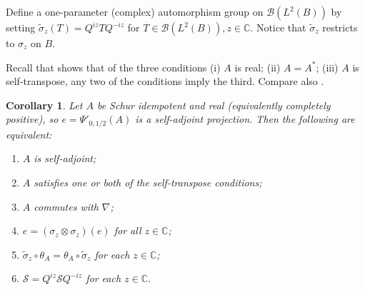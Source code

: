 \documentclass[a4paper,11pt]{article}
\theoremstyle{plain}
\newtheorem{corollary}[proposition]{Corollary}
\theoremstyle{remark}
\newcommand{\mc}[1]{\mathcal{#1}}
\begin{document}
Define a one-parameter (complex) automorphism group on $\mc B(L^2(B))$ by setting $\tilde\sigma_z(T) = Q^{iz} T Q^{-iz}$ for $T\in\mc B(L^2(B)), z\in\mathbb C$.  Notice that $\tilde\sigma_z$ restricts to $\sigma_z$ on $B$.

Recall that \cite{matsuda_class_m2} shows that of the three conditions (i) $A$ is real; (ii) $A=A^*$; (iii) $A$ is self-transpose, any two of the conditions imply the third.  Compare also \cite[Theorem~5.17]{daws_quantum_graphs}.

\begin{corollary}
Let $A$ be Schur idempotent and real (equivalently completely positive), so $e = \Psi'_{0,1/2}(A)$ is a self-adjoint projection.  Then the following are equivalent:
\begin{enumerate}
  \item $A$ is self-adjoint;
  \item $A$ satisfies one or both of the self-transpose conditions;
  \item $A$ commutes with $\nabla$;
  \item $e = (\sigma_z\otimes\sigma_z)(e)$ for all $z\in\mathbb C$;
  \item $\tilde\sigma_z \circ \theta_A = \theta_A \circ \tilde\sigma_z$ for each $z\in\mathbb C$;
  \item $\mc S = Q^{iz} \mc S Q^{-iz}$ for each $z\in\mathbb C$.
\end{enumerate}
\end{corollary}
\end{document}
